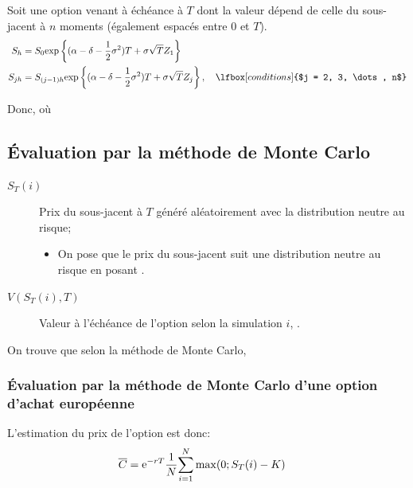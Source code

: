 \documentclass[10pt, french]{article}
\begin{document}
\begin{multicols*}{2}
Soit une option venant à échéance à $T$ dont la valeur dépend de celle du sous-jacent à $n$ moments (également espacés entre $0$ et $T$). 
\begin{align*}
	S_{h}	
	&=	S_{0}\textrm{exp}\left\{ (\alpha - \delta - \frac{1}{2}\sigma^{2})T + \sigma\sqrt{T} Z_{1} \right\}	\\
	S_{jh}	
	&=	S_{(j - 1)h}\textrm{exp}\left\{ (\alpha - \delta - \frac{1}{2}\sigma^{2})T + \sigma\sqrt{T} Z_{j} \right\},	\quad	\lfbox[conditions]{$j	=	2, 3, \dots, n$}
\end{align*}

Donc,  où 


\columnbreak
\subsection{Évaluation par la méthode de Monte Carlo}
\begin{distributions}[Notation]
\begin{description}
	\item[$S_{T}(i)$]	Prix du sous-jacent à $T$ généré aléatoirement avec la distribution neutre au risque;
		\begin{itemize}
		\item	On pose que le prix du sous-jacent suit une distribution neutre au risque en posant 
 .
		\end{itemize}
	\item[$V(S_{T}(i), T)$]	Valeur à l'échéance de l'option selon la simulation $i$, .
\end{description}
\end{distributions}

On trouve que selon la méthode de Monte Carlo, 

\subsubsection*{Évaluation par la méthode de Monte Carlo d'une option d'achat européenne}
L'estimation du prix de l'option est donc:
\begin{align*}
	\overline{C}
	&=	\textrm{e}^{-rT} \frac{1}{N} \overset{N}{\underset{i	=	1}{\sum}} \max(0; S_{T}(i)	-	K)
\end{align*}


\end{multicols*}
\end{document}

